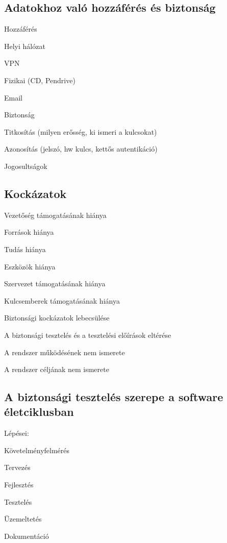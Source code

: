 \documentclass[a4paper,14pt, twocolumn]{extarticle}
\begin{document}
		\subsection{Adatokhoz való hozzáférés és biztonság}
			\begin{compactitem}
				\item Hozzáférés
				{
					\begin{compactitem}
					\item Helyi hálózat 
					\item VPN 
					\item Fizikai (CD, Pendrive) 
					\item Email 
					\end{compactitem}
				}
				\item Biztonság
				{
					\begin{compactitem}
						\item Titkosítás (milyen erősség, ki ismeri a kulcsokat) 
						\item Azonosítás (jelszó, hw kulcs, kettős autentikáció) 
						\item Jogosultságok
					\end{compactitem}
				}
			\end{compactitem}
		\subsection{Kockázatok}
		\begin{compactitem}
			\item Vezetőség támogatásának hiánya 
			\item Források hiánya
			{
				\begin{compactitem}
					\item Tudás hiánya 
					\item Eszközök hiánya 
				\end{compactitem}
			}
			\item Szervezet támogatásának hiánya 
			\item Kulcsemberek támogatásának hiánya 
			\item Biztonsági kockázatok lebecsülése 
			\item A biztonsági tesztelés és a tesztelési előírások eltérése 
			\item A rendszer működésének nem ismerete 
			\item A rendszer céljának nem ismerete
		\end{compactitem}
		\subsection{A biztonsági tesztelés szerepe a software életciklusban}
			Lépései:
			\begin{compactitem}
				\item Követelményfelmérés 
				\item Tervezés 
				\item Fejlesztés 
				\item Tesztelés 
				\item Üzemeltetés 
				\item Dokumentáció
			\end{compactitem}
			\newpage
			
\end{document}
